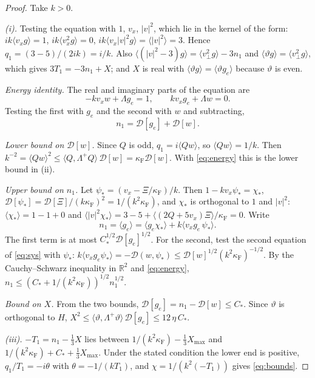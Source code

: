 \documentclass[11pt]{article}
\newcommand{\cD}{\mathcal{D}}
\newcommand{\avg}[1]{\langle #1\rangle}
\theoremstyle{remark}
\begin{document}
\begin{proof}
Take $k>0$.

\emph{(i).} Testing the equation with $1$, $v_x$, $|v|^2$, which lie in the
kernel of the form: $ik\avg{v_xg}=1$, $ik\avg{v_x^2g}=0$,
$ik\avg{v_x|v|^2g}=\avg{|v|^2}=3$. Hence $q_1=(3-5)/(2ik)=i/k$. Also
$\avg{(|v|^2-3)g}=\avg{v_\perp^2g}-3n_1$ and
$\avg{\vartheta g}=\avg{v_\perp^2g}$, which gives $3T_1=-3n_1+X$; and $X$ is
real with $\avg{\vartheta g}=\avg{\vartheta g_e}$ because $\vartheta$ is
even.

\emph{Energy identity.} The real and imaginary parts of the equation are
\begin{equation}
  -kv_xw+\Lambda g_e=1,\qquad kv_xg_e+\Lambda w=0 .
  \label{eq:sys}
\end{equation}
Testing the first with $g_e$ and the second with $w$ and subtracting,
\begin{equation}
  n_1=\cD[g_e]+\cD[w].
  \label{eq:energy}
\end{equation}

\emph{Lower bound on $\cD[w]$.} Since $Q$ is odd, $q_1=i\avg{Qw}$, so
$\avg{Qw}=1/k$. Then
$k^{-2}=\avg{Qw}^2\le\avg{Q,\Lambda^+Q}\,\cD[w]=\kappa_{\mathrm F}\cD[w]$.
With \eqref{eq:energy} this is the lower bound in (ii).

\emph{Upper bound on $n_1$.} Let
$\psi_*=(v_x-\Xi/\kappa_{\mathrm F})/k$. Then
$1-kv_x\psi_*=\chi_*$, $\cD[\psi_*]=\cD[\Xi]/(k\kappa_{\mathrm F})^2
=1/(k^2\kappa_{\mathrm F})$, and $\chi_*$ is orthogonal to $1$ and $|v|^2$:
$\avg{\chi_*}=1-1+0$ and
$\avg{|v|^2\chi_*}=3-5+\avg{(2Q+5v_x)\Xi}/\kappa_{\mathrm F}=0$. Write
\[
  n_1=\avg{g_e}=\avg{g_e\chi_*}+k\avg{v_xg_e\,\psi_*}.
\]
The first term is at most $C_*^{1/2}\cD[g_e]^{1/2}$. For the second, test
the second equation of \eqref{eq:sys} with $\psi_*$:
$k\avg{v_xg_e\psi_*}=-\cD(w,\psi_*)\le\cD[w]^{1/2}(k^2\kappa_{\mathrm F})^{-1/2}$.
By the Cauchy--Schwarz inequality in $\mathbb{R}^2$ and \eqref{eq:energy},
$n_1\le(C_*+1/(k^2\kappa_{\mathrm F}))^{1/2}n_1^{1/2}$.

\emph{Bound on $X$.} From the two bounds, $\cD[g_e]=n_1-\cD[w]\le C_*$. Since
$\vartheta$ is orthogonal to $H$,
$X^2\le\avg{\vartheta,\Lambda^+\vartheta}\,\cD[g_e]\le12\,\eta\,C_*$.

\emph{(iii).} $-T_1=n_1-\tfrac13X$ lies between
$1/(k^2\kappa_{\mathrm F})-\tfrac13X_{\max}$ and
$1/(k^2\kappa_{\mathrm F})+C_*+\tfrac13X_{\max}$. Under the stated condition
the lower end is positive, $q_1/T_1=-i\theta$ with $\theta=-1/(kT_1)$, and
$\chi=1/(k^2(-T_1))$ gives \eqref{eq:bounds}.
\end{proof}
\end{document}
